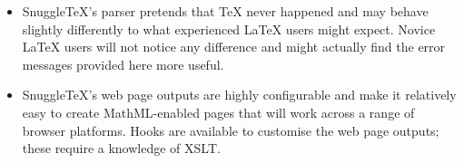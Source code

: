 \begin{itemize}
  \item SnuggleTeX's parser pretends that TeX never happened and may behave slightly
        differently to what experienced LaTeX users might expect. Novice LaTeX users
        will not notice any difference and might actually find the error
        messages provided here more useful.

  \item SnuggleTeX's web page outputs are highly configurable and make it relatively
        easy to create MathML-enabled pages that will work across a range of
        browser platforms. Hooks are available to customise the web page outputs;
        these require a knowledge of XSLT.

\end{itemize}
